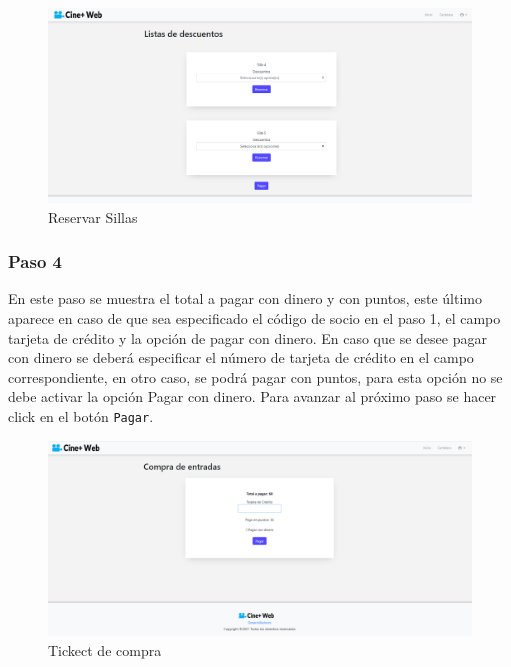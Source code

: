 \begin{figure}[h!]
	\centering
	\includegraphics[scale=0.35]{./chapters/img/reserve.png}
	
	\label{fig:reserve}
	\caption{Reservar Sillas}
\end{figure}

\subsubsection{Paso 4}
En este paso se muestra el total a pagar con dinero y con puntos, este \'ultimo aparece en caso de que sea especificado el c\'odigo de socio en el paso 1, el campo tarjeta de cr\'edito y la opci\'on de pagar con dinero. En caso que se desee pagar con dinero se deber\'a especificar el n\'umero de tarjeta de cr\'edito en el campo correspondiente, en otro caso, se podr\'a pagar con puntos, para esta opci\'on no se debe activar la opci\'on  Pagar con dinero. Para avanzar al pr\'oximo paso se hacer click en el bot\'on \verb*|Pagar|.

\begin{figure}[h!]
	\centering
	\includegraphics[scale=0.35]{./chapters/img/ticketpurchase2.png}
	
	\label{fig:ticketpurchase2}
	\caption{Tickect de compra}
	
\end{figure}


